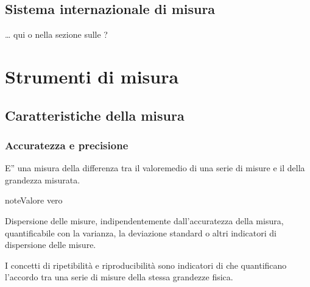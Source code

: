 \documentclass[letterpaper,10pt,italian]{jupyterBook}
\begin{document}
\subsection{Sistema internazionale di misura}
\label{\detokenize{ch/intro/measurements:sistema-internazionale-di-misura}}
\sphinxAtStartPar
… qui o nella sezione sulle {\hyperref[\detokenize{ch/intro/physical_quantities:physics-hs-intro-physical-quantities}]{}}?


\section{Strumenti di misura}
\label{\detokenize{ch/intro/measurements:strumenti-di-misura}}\label{\detokenize{ch/intro/measurements:physics-hs-intro-measurements-instruments}}

\subsection{Caratteristiche della misura}
\label{\detokenize{ch/intro/measurements:caratteristiche-della-misura}}\label{\detokenize{ch/intro/measurements:physics-hs-intro-measurements-instruments-characteristics}}

\subsubsection{Accuratezza e precisione}
\label{\detokenize{ch/intro/measurements:accuratezza-e-precisione}}\label{\detokenize{ch/intro/measurements:physics-hs-intro-measurements-instruments-characteristics-accuracy}}
\sphinxAtStartPar
{} E” una misura della differenza tra il valoremedio di una serie di misure e il  della grandezza misurata.

\begin{sphinxadmonition}{note}{Valore vero}

\sphinxAtStartPar
{}
\end{sphinxadmonition}

\sphinxAtStartPar
{} Dispersione delle misure, indipendentemente dall’accuratezza della misura, quantificabile con la varianza, la deviazione standard o altri indicatori di dispersione delle misure.

\sphinxAtStartPar
{} I concetti di ripetibilità e riproducibilità sono indicatori di  che quantificano l’accordo tra una serie di misure della stessa grandezze fisica.
\end{document}
